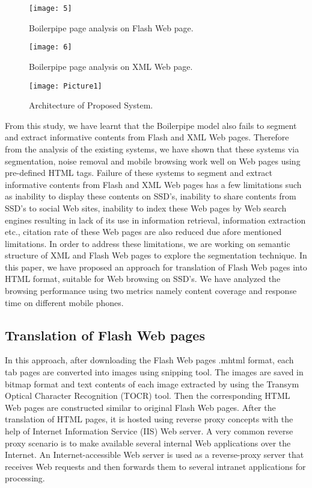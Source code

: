 \documentclass[fleqn,twoside]{article}
\begin{document}
\begin{figure*}[!ht]
\centering
\texttt{[image: 5]}
\caption{Boilerpipe page analysis on Flash Web page.}
\end{figure*}

\begin{figure*}[ht!]
\centering
\texttt{[image: 6]}
\caption{Boilerpipe page analysis on XML Web page.}
\end{figure*}


\begin{figure*}[ht!]
\centering
\texttt{[image: Picture1]}
\caption{Architecture of Proposed System.}
\end{figure*}



\vskip 2mm
From this study, we have learnt that the Boilerpipe model also fails to segment and extract informative contents from Flash and XML Web pages. Therefore from the analysis of the existing systems, we have shown that these systems via segmentation, noise removal and mobile browsing work well on Web pages using pre-defined HTML tags.  Failure of these systems to segment and extract informative contents from Flash and XML Web pages has a few limitations such as inability to display these contents on SSD's, inability to share contents from SSD's to social Web sites, inability to index these Web pages by Web search engines resulting in lack of its use in information retrieval, information extraction etc., citation rate of these Web pages are also reduced due afore mentioned limitations.
\vskip 2mm   
In order to address these limitations, we are working on semantic structure of XML and Flash Web pages to explore the segmentation technique. In this paper, we have proposed an approach for translation of Flash Web pages into HTML format, suitable for Web browsing on SSD's. We have analyzed the browsing performance using two metrics namely content coverage and response time on different mobile phones.

\subsection{Translation of Flash Web pages}
In this approach, after downloading the Flash Web pages .mhtml format, each tab pages are converted into images using snipping tool. The images are saved in bitmap format and text contents of each image extracted by using the Transym Optical Character Recognition (TOCR) tool. Then the corresponding HTML Web pages are constructed similar to original Flash Web pages.
\vskip 2mm
   After the translation of HTML pages, it is hosted using reverse proxy concepts with the help of Internet Information Service (IIS) Web server. A very common reverse proxy scenario is to make available several internal Web applications over the Internet.    An Internet-accessible Web server is used as a reverse-proxy server that receives Web requests and then forwards them to several intranet applications for processing.
\vskip 2mm	
\end{document}
